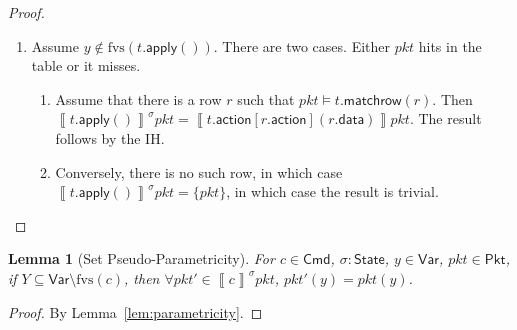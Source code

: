 \documentclass{article}
\newcommand{\pkt}{\mathit{pkt}}
\newcommand{\denote}[1]{\left\llbracket#1\right\rrbracket}
\newcommand{\Cmd}{\mathsf{Cmd}}
\newcommand{\Pkt}{\mathsf{Pkt}}
\newcommand{\Var}{\mathsf{Var}}
\newcommand{\State}{\mathsf{State}}
\newcommand{\action}{\mathsf{action}}
\newcommand{\data}{\mathsf{data}}
\newcommand{\apply}{\mathsf{apply}}
\newcommand{\fvs}{\textrm{fvs}}
\newcommand{\matchrow}{\mathsf{matchrow}}
\theoremstyle{plain}
\newtheorem{lemma}{Lemma}
\theoremstyle{definition}
\theoremstyle{remark}
\begin{document}
\begin{proof}
\begin{enumerate}[align=left]
  \item[$(t.\apply())$] Assume $y \not\in \fvs(t.\apply())$.
    There are two cases. Either $\pkt$ hits in the table or it misses.
    \begin{enumerate}[align=left]
    \item[\textit{Case 1}.] Assume that there is a row $r$ such that $\pkt
      \models t.\matchrow(r)$. Then $\denote{t.\apply()}^\sigma \pkt =
      \denote{t.\action[r.\action](r.\data)} \pkt$. The result follows by the
      IH.

    \item[\textit{Case 2}.] Conversely, there is no such row, in which case
      $\denote{t.\apply()}^\sigma\pkt = \{\pkt\}$, in which case the result is
      trivial.
    \end{enumerate}
  \end{enumerate}
\end{proof}

\begin{lemma}[Set Pseudo-Parametricity]
  \label{lem:parametricity-set}
  For $c \in \Cmd$, $\sigma : \State$, $y \in \Var$, $\pkt \in \Pkt$, if $Y
  \subseteq \Var \setminus \fvs(c)$, then $\forall \pkt' \in \denote{c}^\sigma
  \pkt$, $\pkt'(y) = \pkt(y)$.
\end{lemma}

\begin{proof}
By Lemma~\ref{lem:parametricity}.
\end{proof}
\end{document}
